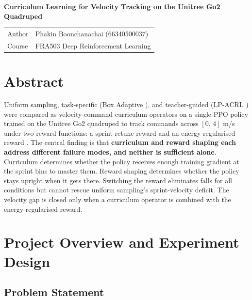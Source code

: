 \documentclass[a4paper,11pt]{article}
\begin{document}
    \begin{center}
    \Large\textbf{Curriculum Learning for Velocity Tracking on the Unitree Go2 Quadruped}
    \end{center}

    \vspace{0.2cm}

    \begin{tabular}{@{}ll}
    Author  & Phakin Boonchanachai (66340500037) \\
    Course  & FRA503 Deep Reinforcement Learning \\
    \end{tabular}

    \vspace{0.3cm}

    \section*{Abstract}

    Uniform sampling, task-specific (Box Adaptive \cite{margolis2022}), and teacher-guided (LP-ACRL \cite{li2026}) were compared as velocity-command curriculum operators on a single PPO policy trained on the Unitree Go2 quadruped to track commands across $[0,\,4]$ m/s under two reward functions: a sprint-retune reward and an energy-regularised reward \cite{liang2024}. The central finding is that \textbf{curriculum and reward shaping each address different failure modes, and neither is sufficient alone}. Curriculum determines whether the policy receives enough training gradient at the sprint bins to master them. Reward shaping determines whether the policy stays upright when it gets there. Switching the reward eliminates falls for all conditions but cannot rescue uniform sampling's sprint-velocity deficit. The velocity gap is closed only when a curriculum operator is combined with the energy-regularised reward.

    \section{Project Overview and Experiment Design}

    \subsection{Problem Statement}
\end{document}

